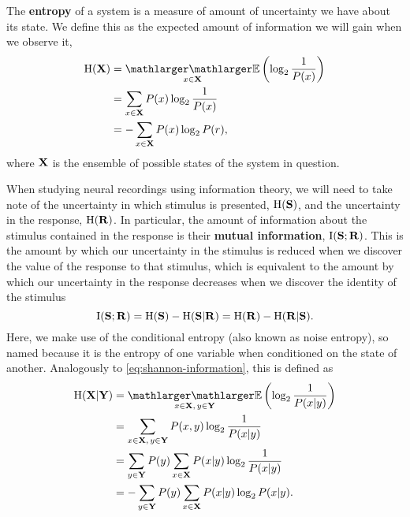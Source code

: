 The \textbf{entropy} of a system is a measure of amount of uncertainty we have about its state.
We define this as the expected amount of information we will gain when we observe it,
\begin{align}
\HH( \SET{X} )
  &= \EE_{x \in \SET{X}} \left( \log_2 \frac{1}{P(x)} \right) \notag
\\&= \sum_{x \in \SET{X}} P(x) \log_2 \frac{1}{P(x)} \notag
\\&= - \sum_{x \in \SET{X}} P(x) \log_2 P(r)
,\end{align}
where $\mathbf{X}$ is the ensemble of possible states of the system in question.

When studying neural recordings using information theory, we will need to take note of the uncertainty in which stimulus is presented, $\operatorname{H}(\mathbf{S})$, and the uncertainty in the response, $\operatorname{H}(\mathbf{R})$.
In particular, the amount of information about the stimulus contained in the response is their \textbf{mutual information}, $\operatorname{I}(\mathbf{S};\mathbf{R})$.
This is the amount by which our uncertainty in the stimulus is reduced when we discover the value of the response to that stimulus, which is equivalent to the amount by which our uncertainty in the response decreases when we discover the identity of the stimulus
\begin{equation}
\label{eq:info}
\operatorname{I}(\mathbf{S};\mathbf{R}) = \operatorname{H}(\mathbf{S}) - \operatorname{H}(\mathbf{S} | \mathbf{R}) = \operatorname{H}(\mathbf{R}) - \operatorname{H}(\mathbf{R} | \mathbf{S})
.\end{equation}
Here, we make use of the conditional entropy (also known as noise entropy), so named because it is the entropy of one variable when conditioned on the state of another.
Analogously to \autoref{eq:shannon-information}, this is defined as
\begin{align}
\HH(\SET{X} | \SET{Y})
  &= \EE_{x \in \SET{X}, \, y \in \SET{Y}} \left( \log_2 \frac{1}{P(x|y)} \right) \notag
\\&= \sum_{x \in \SET{X}, \, y \in \SET{Y}} P(x,y) \log_2 \frac{1}{P(x|y)} \notag
\\&= \sum_{y \in \SET{Y}} P(y) \sum_{x \in \SET{X}} P(x|y) \log_2 \frac{1}{P(x|y)} \notag
\\&= - \sum_{y \in \SET{Y}} P(y) \sum_{x \in \SET{X}} P(x|y) \log_2 P(x|y)
.\end{align}

